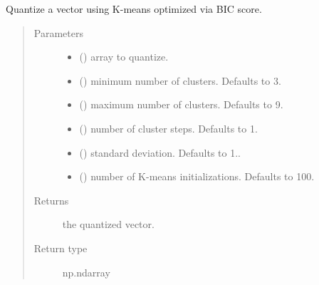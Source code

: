 \documentclass[letterpaper,10pt,english]{sphinxmanual}
\begin{document}
\begin{fulllineitems}
\label{\detokenize{_modules/cosifer.utils:cosifer.utils.vector_quantization.k_means_vector_quantization}}
Quantize a vector using K-means optimized via BIC score.
\begin{quote}\begin{description}
\item[{Parameters}] \leavevmode\begin{itemize}
\item {} 
 () \textendash{} array to quantize.

\item {} 
 (\sphinxstyleliteralemphasis{\sphinxupquote{, }}) \textendash{} minimum number of clusters. Defaults to 3.

\item {} 
 (\sphinxstyleliteralemphasis{\sphinxupquote{, }}) \textendash{} maximum number of clusters. Defaults to 9.

\item {} 
 (\sphinxstyleliteralemphasis{\sphinxupquote{, }}) \textendash{} number of cluster steps. Defaults to 1.

\item {} 
 (\sphinxstyleliteralemphasis{\sphinxupquote{, }}) \textendash{} standard deviation. Defaults to 1..

\item {} 
 (\sphinxstyleliteralemphasis{\sphinxupquote{, }}) \textendash{} number of K-means initializations.
Defaults to 100.

\end{itemize}

\item[{Returns}] \leavevmode
the quantized vector.

\item[{Return type}] \leavevmode
np.ndarray

\end{description}\end{quote}

\end{fulllineitems}
\end{document}
